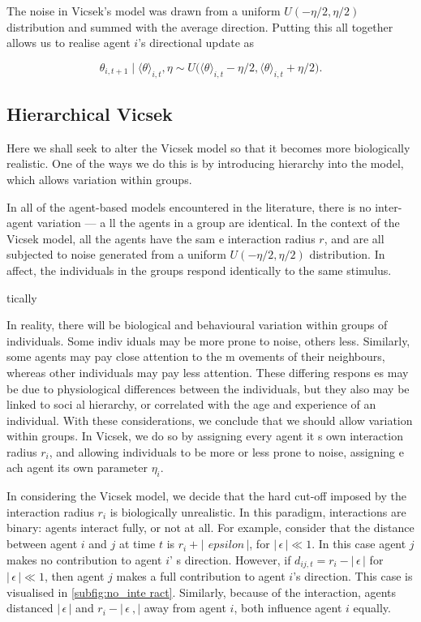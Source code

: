 The noise in Vicsek's model was drawn from a uniform $U(-\eta/2, \eta/2)$ distribution and summed with 
the average direction. Putting this all together allows us to realise agent $i$'s directional update as

\begin{equation}
\label{eq:vicsek_update}
	\theta_{i,t+1} \mid \langle \theta \rangle_{i, t}, \eta \sim U\big(\langle \theta \rangle_{i, t} -\eta
/2, \langle \theta \rangle_{i, t} + \eta/2\big).
\end{equation}

\subsection{Hierarchical Vicsek}
\label{ssec:general_vicsek}

Here we shall seek to alter the Vicsek model so that it becomes more biologically realistic. One of the
 ways we do this is by introducing hierarchy into the model, which allows variation within groups. 

In all of the agent-based models encountered in the literature, there is no inter-agent variation --- a
ll the agents in a group are identical. In the context of the Vicsek model, all the agents have the sam
e interaction radius $r$, and are all subjected to noise generated from a uniform $U(-\eta/2, \eta/2)$ 
distribution. In affect, the individuals in the groups respond identically to the same stimulus.

tically

In reality, there will be biological and behavioural variation within groups of individuals. Some indiv
iduals may be more prone to noise, others less. Similarly, some agents may pay close attention to the m
ovements of their neighbours, whereas other individuals may pay less attention. These differing respons
es may be due to physiological differences between the individuals, but they also may be linked to soci
al hierarchy, or correlated with the age and experience of an individual. With these considerations, we
 conclude that we should allow variation within groups. In Vicsek, we do so by assigning every agent it
s own interaction radius $r_i$, and allowing individuals to be more or less prone to noise, assigning e
ach agent its own parameter $\eta_i$.

In considering the Vicsek model, we decide that the hard cut-off imposed by the interaction radius $r_i
$ is biologically unrealistic. In this paradigm, interactions are binary: agents interact fully, or not
 at all. For example, consider that the distance between agent $i$ and $j$ at time $t$ is  $r_i + |\, \
epsilon \,|$, for $|\, \epsilon \, | \ll 1$. In this case agent $j$ makes no contribution to agent $i$'
s direction. However, if $d_{ij, t} = r_i - |\, \epsilon\,| $ for $|\, \epsilon \,| \ll 1$, then agent 
$j$ makes a full contribution to agent $i$'s direction. This case is visualised in \cref{subfig:no_inte
ract}. Similarly, because of the interaction, agents distanced $|\,\epsilon\,|$ and $r_i - |\,\epsilon\
,|$ away from agent $i$, both influence agent $i$ equally.

